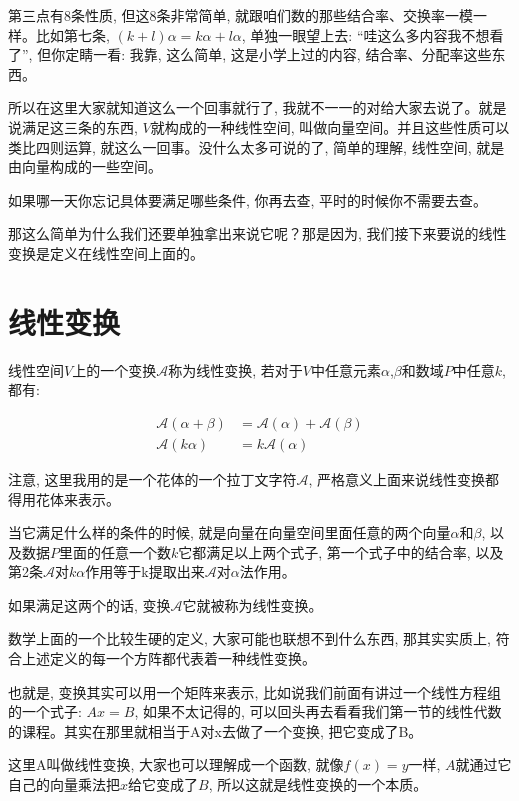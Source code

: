 第三点有8条性质, 但这8条非常简单, 就跟咱们数的那些结合率、交换率一模一样。比如第七条, $(k+ l)\alpha =  k\alpha+ l\alpha$, 单独一眼望上去: “哇这么多内容我不想看了”, 但你定睛一看: 我靠, 这么简单, 这是小学上过的内容, 结合率、分配率这些东西。

所以在这里大家就知道这么一个回事就行了, 我就不一一的对给大家去说了。就是说满足这三条的东西, $V$就构成的一种线性空间, 叫做向量空间。并且这些性质可以类比四则运算, 就这么一回事。没什么太多可说的了, 简单的理解, 线性空间, 就是由向量构成的一些空间。

如果哪一天你忘记具体要满足哪些条件, 你再去查, 平时的时候你不需要去查。

那这么简单为什么我们还要单独拿出来说它呢？那是因为, 我们接下来要说的线性变换是定义在线性空间上面的。

\section{线性变换}

线性空间$V$上的一个变换$\mathcal{A}$称为线性变换, 若对于$V$中任意元素$\alpha$,$\beta$和数域$P$中任意$k$, 都有: 

\begin{align*}
  \mathcal{A}(\alpha+\beta) & = \mathcal{A}(\alpha) + \mathcal{A}(\beta) \\
  \mathcal{A}( k\alpha) & =  k\mathcal{A}(\alpha)
\end{align*}

注意, 这里我用的是一个花体的一个拉丁文字符$\mathcal{A}$, 严格意义上面来说线性变换都得用花体来表示。

当它满足什么样的条件的时候, 就是向量在向量空间里面任意的两个向量$\alpha$和$\beta$, 以及数据$P$里面的任意一个数$k$它都满足以上两个式子, 第一个式子中的结合率, 以及第2条$\mathcal{A}$对$k\alpha$作用等于k提取出来$\mathcal{A}$对$\alpha$法作用。

如果满足这两个的话, 变换$\mathcal{A}$它就被称为线性变换。

数学上面的一个比较生硬的定义, 大家可能也联想不到什么东西, 那其实实质上, 符合上述定义的每一个方阵都代表着一种线性变换。

也就是, 变换其实可以用一个矩阵来表示, 比如说我们前面有讲过一个线性方程组的一个式子: $Ax = B$, 如果不太记得的, 可以回头再去看看我们第一节的线性代数的课程。其实在那里就相当于A对x去做了一个变换, 把它变成了B。

这里A叫做线性变换, 大家也可以理解成一个函数, 就像$f(x)=y$一样, $A$就通过它自己的向量乘法把$x$给它变成了$B$, 所以这就是线性变换的一个本质。

